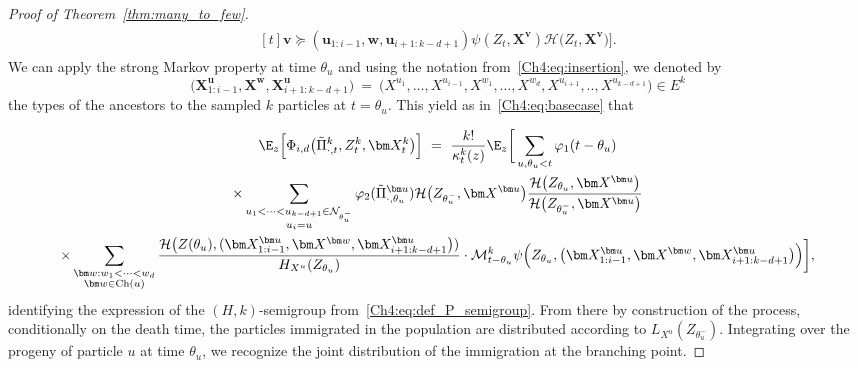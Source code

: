 \begin{refsegment}
\begin{proof}[Proof of Theorem~\ref{thm:many_to_few}]
\begin{align*}
\begin{multlined}[t]
{{    \bm{v}\succcurlyeq   (\bm{u}_{1:i-1}, \bm{w}, \bm{u}_{i+1:k-d+1})}}\psi(Z_t, \bm X^{\bm v}) \mathcal{H}\big(Z_t,\bm X^{\bm v}\big) \bigg].\end{multlined}
\end{align*}
We can apply the strong Markov property at time $\theta_u$  
and using the notation from~\eqref{Ch4:eq:insertion}, we denoted by
\[ \big(\bm X^{\bm u}_{1: i-1}, \bm X^{\bm w},\bm X^{\bm u}_{i+1:k-d+1}\big)\ =\ \big(X^{u_1},\ldots, X^{u_{i-1}}, X^{w_1},\ldots, X^{w_d}, X^{u_{i+1}},.., X^{u_{k-d+1}}\big) \in E^k
\]
the types of the ancestors to the sampled $k$ particles at $t=\theta_u$.
This yield as in~\eqref{Ch4:eq:basecase} that

 \begin{multline*}\E_{z}\Big[\Phi_{i,d}\big(\tilde{\Pi}^k_{\cdot,t},  Z^k_t, \bm X^k_t \big)\Big]\ =\  \frac{k!}{\kappa^k_{t}(z)}\E_{z}\bigg[\sum_{u, \theta_u<t} \varphi_1(t-\theta_u)\\
  \times\sum_{\substack{u_1<\cdots<u_{k-d+1}\in\mathcal{N}_{\theta_u^-}\\ u_i=u}} \varphi_2(\tilde\Pi^{\bm u}_{\cdot,\theta_u}) \mathcal{H}\big(Z_{\theta_u^-}, \bm X^{\bm u}\big)\frac{\mathcal{H}\big(Z_{\theta_u}, \bm X^{\bm u}\big)}{\mathcal{H}\big(Z_{\theta_u^-}, \bm X^{\bm u}\big)}\\
  \times \sum_{\substack{\bm w: w_1<\cdots<w_d \\
    \bm w\in\mathrm{Ch}(u)}} \frac{\mathcal{H}\big(Z(\theta_u), (\bm X^{\bm u}_{1: i-1},\bm X^{\bm w},\bm X^{\bm u}_{i+1:k-d+1}\big))}{H_{X^u}(Z_{\theta_u})} \cdot  \mathcal{M}^k_{t-\theta_u}{\psi}\Big(Z_{\theta_u}, \big(\bm X^{\bm u}_{1: i-1}, \bm X^{\bm w},\bm X^{\bm u}_{i+1:k-d+1}\big)\Big) \bigg],
  \end{multline*}
identifying the expression of the $(H,k)$-semigroup  from~\eqref{Ch4:eq:def_P_semigroup}. From there by construction of the process, conditionally on the death time, the particles immigrated in the population are distributed according to $L_{X^u}(Z_{\theta_u^-})$. Integrating over the progeny of particle $u$ at time $\theta_u$, we recognize the joint distribution of the immigration at the branching point. 


\end{proof}
\end{refsegment}

